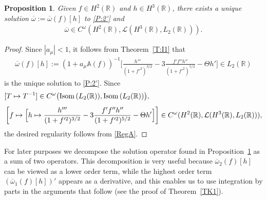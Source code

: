 \documentclass[11pt,reqno]{amsart}
\numberwithin{equation}{section}
\newcommand{\0}{\Omega}
\newcommand{\ov}{\overline}
\newcommand{\oo}{\ov\omega}
\newcommand{\bA}{\mathbb{A}}
\newcommand{\kL}{\mathcal{L}}
\newcommand{\R}{\mathbb{R}}
\newtheorem{prop}[thm]{Proposition}
\numberwithin{equation}{section}
\begin{document}
\begin{prop}\label{P1} Given $f\in H^2(\R) $   and $h\in H^3(\R)$,  there exists a unique solution $\oo:=\oo(f)[h]$ to  \eqref{P:2'} and
\begin{align}\label{RegO}
 \oo\in C^\omega(H^2(\R), \kL(H^3(\R), L_2(\R))).
\end{align}
\end{prop}
\begin{proof} Since $|a_\mu|<1$, it follows from Theorem~\ref{T:I1} that 
\begin{align*}
 \oo(f)[h]:= (1+a_\mu\bA(f))^{-1}\Big[\frac{h'''}{(1+f'^2)^{3/2}}-3\frac{f'{f''}h''}{(1+f'^2)^{5/2}}-\Theta h'\Big]\in L_2(\R)
\end{align*}
is the unique solution to \eqref{P:2'}.
 Since
 \begin{align*}
  &[T\mapsto T^{-1}]\in C^\omega\big({\rm Isom\,}(L_2(\R)), {\rm Isom\,}(L_2(\R))\big),\\[1ex]
  &\left[f\mapsto \Big[h\mapsto\frac{h'''}{(1+f'^2)^{3/2}}-3\frac{f'f''h''}{(1+f'^2)^{5/2}}-\Theta h'\Big]\right]\in C^\omega(H^2(\R),\kL(H^3(\R),L_2(\R))),
 \end{align*}
  the desired regularity follows from \eqref{RegA}.
\end{proof}

For later purposes we decompose the solution operator found in Proposition~\ref{P1} as a sum of two operators. 
This decomposition   is very useful   because $\oo_2(f)[h] $ can be viewed as a lower order term, while the highest order term $(\oo_1(f)[h])'$ appears as a derivative, and  this  enables us to use integration by parts 
in the arguments that follow (see the proof of Theorem~\ref{TK1}). 
\end{document}
